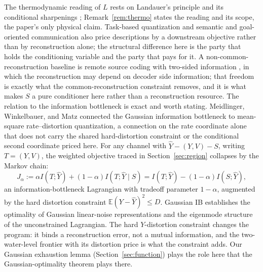 ﻿\documentclass[11pt,onecolumn]{IEEEtran}
\newcommand{\E}{\mathbb{E}}
\newcommand{\hY}{\widehat{Y}}
\begin{document}
The thermodynamic reading of $L$ rests on Landauer's principle
\cite{landauer1961} and its conditional sharpenings
\cite{delrio2011,faist2015}; Remark~\ref{rem:thermo} states the reading
and its scope, the paper's only physical claim. Task-based quantization
\cite{shlezinger2019} and semantic and goal-oriented communication
\cite{gunduz2023} also price descriptions by a downstream objective
rather than by reconstruction alone; the structural difference here is
the party that holds the conditioning variable and the party that pays
for it. A non-common-reconstruction baseline is remote source coding with
two-sided information \cite{guler2015}, in which the reconstruction may
depend on decoder side information; that freedom is exactly what the
common-reconstruction constraint removes, and it is what makes $S$ a pure
conditioner here rather than a reconstruction resource. The relation to the information bottleneck
\cite{tishby1999} is exact and worth stating. Meidlinger, Winkelbauer,
and Matz \cite{meidlinger2014} connected the Gaussian information
bottleneck to mean-square rate--distortion quantization, a connection on
the rate coordinate alone that does not carry the shared hard-distortion
constraint or the conditional second coordinate priced here. For any
channel with
$\hY-(Y,V)-S$, writing $T=(Y,V)$, the weighted objective traced in
Section~\ref{sec:region} collapses by the Markov chain:
\begin{equation}
J_\alpha:=\alpha I(T;\hY)+(1-\alpha)I(T;\hY\mid S)
=I(T;\hY)-(1-\alpha)I(S;\hY),
\label{eq:ib-identity}
\end{equation}
an information-bottleneck Lagrangian with tradeoff parameter
$1-\alpha$, augmented by the hard distortion constraint
$\E(Y-\hY)^2\le D$. Gaussian IB \cite{chechik2005} establishes the
optimality of Gaussian linear-noise representations and the eigenmode
structure of the unconstrained Lagrangian. The hard $Y$-distortion
constraint changes the program: it binds a reconstruction error, not a
mutual information, and the two-water-level frontier with its
distortion price is what the constraint adds. Our Gaussian exhaustion
lemma (Section~\ref{sec:function}) plays the role here that the
Gaussian-optimality theorem plays there.
\end{document}
